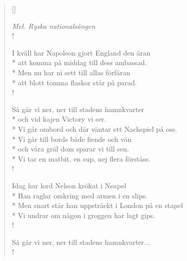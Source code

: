 
\settowidth{\versewidth}{I kväll har Napoleon gjort England den äran}



\begin{verse}[\versewidth]

\flagverse{}
\emph{Mel. Ryska nationalsången}\\!


I kväll har Napoleon gjort England den äran\\*
att komma på middag till dess ambassad.\\*
Men nu har ni sett till allas förfäran\\*
att blott tomma flaskor står på parad.\\!


Så går vi ner, ner till stadens hamnkvarter\\*
och vid kajen Victory vi ser.\\*
Vi går ombord och där väntar ett Nachspiel på oss.\\*
Vi går till bords både fiende och vän\\*
och våra gräl dom sparar vi till sen.\\*
Vi tar en matbit, en sup, nej flera förståss.\\!


Idag har lord Nelson krökat i Neapel\\*
Han raglar omkring med armen i en slips.\\*
Men snart står han uppsträckt i London på en stapel\\*
Vi undrar om någon i groggen har lagt gips.\\!


Så går vi ner, ner till stadens hamnkvarter...\\!




\end{verse}

